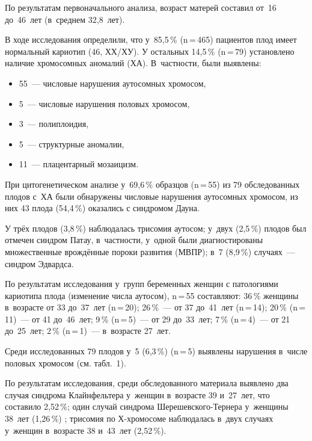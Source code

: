 По результатам первоначального анализа, возраст матерей составил от~16 до~46~лет (в~среднем 32,8~лет).

В ходе исследования определили, что у~85,5\,\% (n\,=\,465) пациентов плод имеет нормальный кариотип (46, ХХ/ХУ). У остальных 14,5\,\% (n\,=\,79) установлено наличие хромосомных аномалий (ХА). В~частности, были выявлены:
\begin{itemize}[noitemsep]\vspace{-10pt}
  \item 55~--- числовые нарушения аутосомных хромосом,
\item  5~--- числовые нарушения половых хромосом,
\item  3~--- полиплоидия,
\item  5~--- структурные аномалии,
\item  11~--- плацентарный мозаицизм.
\end{itemize}
\vspace{-10pt}

При цитогенетическом анализе у~69,6\,\% образцов (n\,=\,55) из 79 обследованных плодов с~ХА были обнаружены числовые нарушения аутосомных хромосом, из них 43 плода (54,4\,\%) оказались с синдромом Дауна.

У трёх плодов (3,8\,\%) наблюдалась трисомия аутосом; у~двух (2,5\,\%) плодов был отмечен синдром Патау, в~частности, у~одной были диагностированы множественные врождённые пороки развития (МВПР); в~7 (8,9\,\%) случаях~--- синдром Эдвардса.

По результатам исследования у~групп беременных женщин с патологиями кариотипа плода (изменение числа аутосом), n\,=\,55 составляют: 36\,\% женщины в~возрасте от 33 до~37~лет (n\,=\,20); 26\,\%~--- от 37 до~41~лет (n\,=\,14); 20\,\% (n\,=\,11)~--- от 41 до~46~лет; 9\,\% (n\,=\,5)~--- от 29 до~33~лет; 7\,\% (n\,=\,4)~--- от 21 до~25~лет; 2\,\% (n\,=\,1)~--- в~возрасте 27~лет.


Среди исследованных 79 плодов у~5 (6,3\,\%) (n\,=\,5) выявлены нарушения в~числе половых хромосом (см. табл.~1).



По результатам исследования, среди обследованного материала выявлено два случая синдрома Клайнфельтера у~женщин в~возрасте 39 и~27~лет, что составило 2,52\,\%; \enlargethispage{2\baselineskip}один случай синдрома Шерешевского-Тернера у~женщины 38~лет (1,26\,\%) ; трисомия по Х-хромосоме наблюдалась в~двух случаях у~женщин в~возрасте 38 и~43~лет (2,52\,\%).

